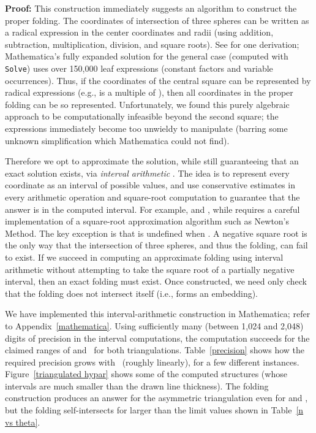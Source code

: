 \documentclass[11pt,letterpaper]{article}
\newenvironment{proof}{\noindent\textbf{Proof: }\ignorespaces}
  {\hspace*{\fill}\medskip}
\begin{document}
\begin{proof}
  This construction immediately suggests an algorithm to construct the
  proper folding.  The coordinates of intersection of three spheres can be
  written as a radical expression in the center coordinates and radii
  (using addition, subtraction, multiplication, division, and square roots).
  See \cite{Trilateration-wiki} for one derivation;
  Mathematica's fully expanded solution for the general case
  (computed with \texttt{Solve}) uses over 150,000 leaf expressions
  (constant factors and variable occurrences).
  Thus, if the coordinates of the central square can be represented
  by radical expressions (e.g.,  is a multiple of ),
  then all coordinates in the proper folding can be so represented.
  Unfortunately, we found this purely algebraic approach to be
  computationally infeasible beyond the second square; the expressions
  immediately become too unwieldy to manipulate (barring some
  unknown simplification which Mathematica could not find).

  Therefore we opt to approximate the solution, while still guaranteeing
  that an exact solution exists, via \emph{interval arithmetic}
  \cite{Hayes-2003-interval,Moore-Kearfott-Cloud-2009,Alefeld-Herzberger-1983}.
  The idea is to represent every coordinate  as an interval 
  of possible values, and use conservative estimates in every arithmetic
  operation and square-root computation to guarantee that the answer
  is in the computed interval.
  For example,  and
  ,
  while  requires a careful implementation of a square-root
  approximation algorithm such as Newton's Method.
  The key exception is that  is undefined when .
  A negative square root is the only way that the intersection of three
  spheres, and thus the folding, can fail to exist.
  If we succeed in computing an approximate folding using interval
  arithmetic without attempting to take the square root of a partially
  negative interval, then an exact folding must exist.
  Once constructed, we need only check that the folding does not
  intersect itself (i.e., forms an embedding).

  We have implemented this interval-arithmetic construction in Mathematica;
  refer to Appendix~\ref{mathematica}.
  Using sufficiently many (between 1,024 and 2,048)
  digits of precision in the interval computations,
  the computation succeeds for the claimed ranges of  and~
  for both triangulations.
  Table~\ref{precision} shows how the required precision grows with~
  (roughly linearly), for a few different instances.
  Figure~\ref{triangulated hypar} shows some of the computed structures
  (whose intervals are much smaller than the drawn line thickness).
  The folding construction produces an answer
  for the asymmetric triangulation even for  and
  ,
  but the folding self-intersects for  larger
  than the limit values shown in Table~\ref{n vs theta}.
\end{proof}
\end{document}
